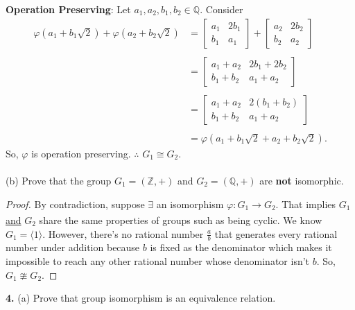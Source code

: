 \documentclass[12pt, letterpaper]{article}
\begin{document}
\textbf{Operation Preserving}: Let $a_1,a_2, b_1, b_2 \in \mathbb{Q}$. Consider
\begin{align*}
     \varphi(a_1 + b_1\sqrt{2}) + \varphi(a_2 + b_2\sqrt{2}) &= \begin{bmatrix}
         a_1 & 2b_1 \\
         b_1 & a_1
     \end{bmatrix} + \begin{bmatrix}
         a_2 & 2b_2 \\
         b_2 & a_2
     \end{bmatrix} \\ \\
     &= \begin{bmatrix}
         a_1 + a_2 & 2b_1 + 2b_2 \\
         b_1 + b_2 & a_1 + a_2
     \end{bmatrix} \\ \\
      &= \begin{bmatrix}
         a_1 + a_2 & 2(b_1 + b_2) \\
         b_1 + b_2 & a_1 + a_2
     \end{bmatrix} \\ \\
     &= \varphi(a_1 + b_1\sqrt{2} + a_2 + b_2\sqrt{2}).
\end{align*}
So, $\varphi$ is operation preserving. $\therefore$ $G_1 \cong G_2$. \\ \\
\qquad \indent{}(b) Prove that the group $G_1 = (\mathbb{Z}, +)$ and $G_2 = (\mathbb{Q}, +)$ are \textbf{not} isomorphic. 
\begin{proof}
    By contradiction, suppose $\exists$ an isomorphism $\varphi: G_1 \xrightarrow[]{} G_2$. That implies $G_1$ \underline{and} $G_2$ share the same properties of groups such as being cyclic. We know $G_1 = \langle 1 \rangle$. However, there's no rational number $\frac{a}{b}$ that generates every rational number under addition because $b$ is fixed as the denominator which makes it impossible to reach any other rational number whose denominator isn't $b$. So, $G_1 \ncong G_2$. 
\end{proof}
\noindent \textbf{4.} \quad (a) Prove that group isomorphism is an equivalence relation.
\end{document}
